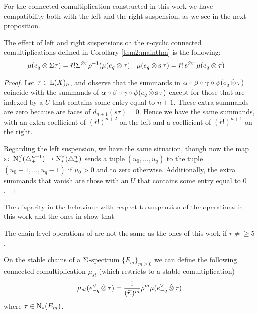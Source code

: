 For the connected comultiplication constructed in this work we have compatibility both with the left and the right suspension, as we see in the next proposition.

\begin{proposition}\label{prop:suspensionconnected}
    The effect of left and right suspensions on the $r$-cyclic connected comultiplications defined in Corollary \ref{thm2:mainthm} is the following:
    \begin{align*}
       \mu(e_q\otimes \Sigma^{}\tau) &= \tilde{r}!\Sigma^{\otimes r}\rho^{-1}(\mu(e_q\otimes \tau) &
       \mu(e_q\otimes \operatorname{s}^{}\tau) &= \tilde{r}!\operatorname{s}^{\otimes r}\mu(e_q\otimes \tau)
    \end{align*}
\end{proposition}

\begin{proof}
    Let $\tau\in \operatorname{L}(X)_n$, and observe that the summands in $\alpha\circ\beta\circ\gamma\circ \psi(e_q\operatorname{\hat{\otimes}} \tau)$ coincide with the summands of $\alpha\circ\beta\circ\gamma\circ \psi(e_q\operatorname{\hat{\otimes}} \operatorname{s}^{}\tau)$ except for those that are indexed by a $U$ that contains some entry equal to $n+1$. These extra summands are zero because are faces of $d_{n+1}(s{} \tau) = 0$. Hence we have the same summands, with an extra coefficient of $(\tilde{r}!)^{n+2}$ on the left and a coefficient of $(\tilde{r}!)^{n+1}$ on the right.

    Regarding the left suspension, we have the same situation, though now the map $\operatorname{s}^{}\colon \operatorname{N}^\vee_{*}(\triangle_{+}^{n+1})\to \operatorname{N}^\vee_{*}(\triangle_{+}^{n})$ sends a tuple $(u_0,\ldots,u_q)$ to the tuple $(u_0-1,\ldots,u_q-1)$ if $u_0>0$ and to zero otherwise. Additionally, the extra summands that vanish are those with an $U$ that contains some entry equal to $0$.
\end{proof}
The disparity in the behaviour with respect to suspension of the operations in this work and the ones in \cite{medina2021may_st} show that
\begin{corollary}
	The chain level operations of \cite{medina2021may_st} are not the same as the ones of this work if $r\neq \geq 5$.
\end{corollary}

\begin{corollary}
    On the stable chains of a $\Sigma^{}$-spectrum $\{E_m\}_{m\geq 0}$ we can define the following connected comultiplication $\mu_{st}$ (which restricts to a stable comultiplication)
    \[
        \mu_{st}(e_{-q}^\vee\operatorname{\hat{\otimes}} \tau) = \frac{1}{(\tilde{r}!)^{m}}\rho^m \mu(e_{-q}^\vee\operatorname{\hat{\otimes}} \tau)
    \]
    where $\tau\in \operatorname{N}_{*}(E_m)$.
\end{corollary}

